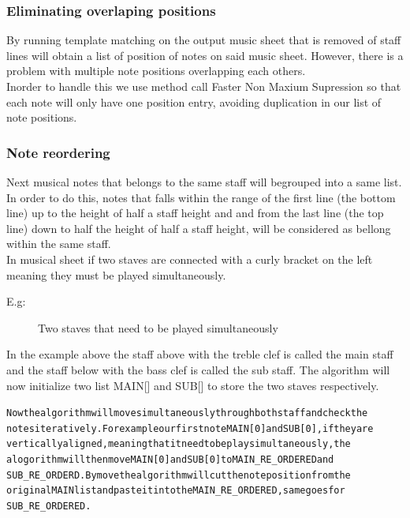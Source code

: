 \documentclass[a4paper,12pt]{report}
\begin{document}
\subsubsection{Eliminating overlaping positions}
By running template matching on the output music sheet that is removed of staff
lines will obtain a list of position of notes on said music sheet. However, 
there is a problem with multiple note positions overlapping each others.\\

Inorder to handle this we use  \textcite{Rosebrock} method call Faster Non
Maxium Supression so that each note will only have one position entry, avoiding
duplication in our list of note positions.\\

\subsubsection{Note reordering}
Next musical notes that belongs to the same staff will begrouped into a same
list.  In order to do this, notes that falls within the range of the first line (the
bottom line) up to the height of half a staff height and and from the last line
(the top line) down to half the height of half a staff height, will be considered
as bellong within the same staff.\\

In musical sheet if two staves are connected with a curly bracket on the left
meaning they must be played simultaneously.

E.g:\\ 
\begin{figure}[h]
\caption{Two staves that need to be played simultaneously}
\label{fig:two staves}
\end{figure}

In the example above the staff above with the treble clef is called the main
staff and the staff below with the bass clef is called the sub staff. The 
algorithm will now initialize two list MAIN[] and SUB[] to store the two staves
respectively.

\begin{alltt}
    \normalfont
Now the algorithm will move simultaneously through both staff and check the
notes iteratively. For example our first note MAIN[0] and SUB[0], if they are
vertically aligned, meaning that it need to be play simultaneously, the
alogorithm will then move MAIN[0] and SUB[0] to MAIN\_RE\_ORDERED and
SUB\_RE\_ORDERD. By move the algorithm will cut the note position from the
original MAIN list and paste it into the MAIN\_RE\_ORDERED, same goes for
SUB\_RE\_ORDERED.
\end{alltt}
\end{document}
